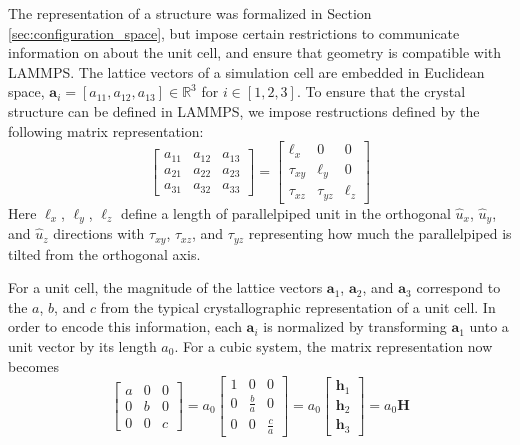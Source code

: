 The representation of a structure was formalized in Section \ref{sec:configuration_space}, but impose certain restrictions to communicate information on about the unit cell, and ensure that geometry is compatible with LAMMPS.
The lattice vectors of a simulation cell are embedded in Euclidean space,  $\bm{a}_i = [a_{11}, a_{12}, a_{13}] \in \mathbb{R}^3$ for $i \in [1,2,3]$.  To ensure that the crystal structure can be defined in LAMMPS, we impose restructions defined by the following matrix representation:
\begin{equation}
	\begin{bmatrix}
		a_{11} & a_{12} & a_{13} \\
		a_{21} & a_{22} & a_{23} \\
		a_{31} & a_{32} & a_{33}
	\end{bmatrix}
	=
	\begin{bmatrix}
		\ell_x    & 0         & 0     \\
		\tau_{xy} & \ell_y    & 0     \\
		\tau_{xz} & \tau_{yz} & \ell_z
	\end{bmatrix}
\end{equation}
Here $\ell_x$, $\ell_y$, $\ell_z$ define a length of parallelpiped unit in the orthogonal $\hat{u}_x$, $\hat{u}_y$, and $\hat{u}_z$ directions with $\tau_{xy}$, $\tau_{xz}$, and $\tau_{yz}$ representing how much the parallelpiped is tilted from the orthogonal axis.

For a unit cell, the magnitude of the lattice vectors $\bm{a}_1$, $\bm{a}_2$, and $\bm{a}_3$ correspond to the $a$,  $b$, and $c$ from the typical crystallographic representation of a unit cell.  In order to encode this information, each $\bm{a}_i$ is normalized by transforming $\bm{a}_1$ unto a unit vector by its length $a_0$.  For a cubic system, the matrix representation now becomes
\begin{equation}
\label{eq:pypospack_lattice_vector}
	\begin{bmatrix}
		a & 0 & 0 \\
		0 & b & 0 \\
		0 & 0 & c
	\end{bmatrix}
	=
	a_0
	\begin{bmatrix}
		1 & 0 & 0 \\
		0 & \frac{b}{a} & 0 \\
		0 & 0 & \frac{c}{a}
	\end{bmatrix}
	=
	a_0 \begin{bmatrix}
				\bm{h}_1 \\
				\bm{h}_2 \\
				\bm{h}_3
			\end{bmatrix}
	=
	a_0 \bm{H}
\end{equation}

